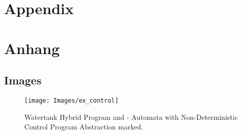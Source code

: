 

{\chapter{Appendix}}    %
{\chapter{Anhang}}      %
\label{chap:appendix}


\section{Images}
	\begin{figure}
		\centering
		\texttt{[image: Images/ex\_control]}
		\caption{Watertank Hybrid Program and - Automata with Non-Deterministic Control Program Abstraction marked.}
		\label{fig:ex_control}
	\end{figure}

